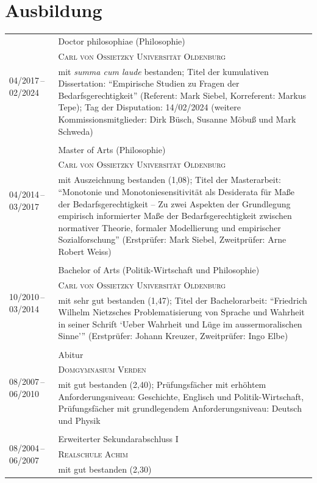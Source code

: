 \documentclass[a4paper,10pt]{article}
\begin{document}
\section{Ausbildung}
\begin{longtable}{p{2.5cm}p{11cm}}
\multirow{3}{2.5cm}{\footnotesize{04/2017\,--\,02/2024}} & Doctor philosophiae (Philosophie)\\
& \textsc{Carl von Ossietzky Universität Oldenburg}\\
& \footnotesize{mit \textit{summa cum laude} bestanden; Titel der kumulativen Dissertation: \enquote{Empirische Studien zu Fragen der Bedarfsgerechtigkeit} (Referent: Mark Siebel, Korreferent: Markus Tepe); Tag der Disputation: 14/02/2024 (weitere Kommissionsmitglieder: Dirk Büsch, Susanne Möbuß und Mark Schweda)}\\
\\
\multirow{3}{2.5cm}{\footnotesize{04/2014\,--\,03/2017}} & Master of Arts (Philosophie)\\
& \textsc{Carl von Ossietzky Universität Oldenburg}\\
& \footnotesize{mit Auszeichnung bestanden (1,08); Titel der Masterarbeit: \enquote{Monotonie und Monotoniesensitivität als Desiderata für Maße der Bedarfsgerechtigkeit -- Zu zwei Aspekten der Grundlegung empirisch informierter Maße der Bedarfsgerechtigkeit zwischen normativer Theorie, formaler Modellierung und empirischer Sozialforschung} (Erstprüfer: Mark Siebel, Zweitprüfer: Arne Robert Weiss)}\\
\\
\multirow{3}{2.5cm}{\footnotesize{10/2010\,--\,03/2014}} & Bachelor of Arts (Politik-Wirtschaft und Philosophie)\\
& \textsc{Carl von Ossietzky Universität Oldenburg}\\
& \footnotesize{mit sehr gut bestanden (1,47); Titel der Bachelorarbeit: \enquote{Friedrich Wilhelm Nietzsches Problematisierung von Sprache und Wahrheit in seiner Schrift \enquote{Ueber Wahrheit und Lüge im aussermoralischen Sinne}} (Erstprüfer: Johann Kreuzer, Zweitprüfer: Ingo Elbe)}\\
\\
\multirow{3}{2.5cm}{\footnotesize{08/2007\,--\,06/2010}} & Abitur\\
& \textsc{Domgymnasium Verden}\\
& \footnotesize{mit gut bestanden (2,40); Prüfungsfächer mit erhöhtem Anforderungsniveau: Geschichte, Englisch und Politik-Wirtschaft, Prüfungsfächer mit grundlegendem Anforderungsniveau: Deutsch und Physik}\\
\\
\multirow{3}{2.5cm}{\footnotesize{08/2004\,--\,06/2007}} & Erweiterter Sekundarabschluss I\\
& \textsc{Realschule Achim}\\
& \footnotesize{mit gut bestanden (2,30)}\\
\end{longtable}
\end{document}
